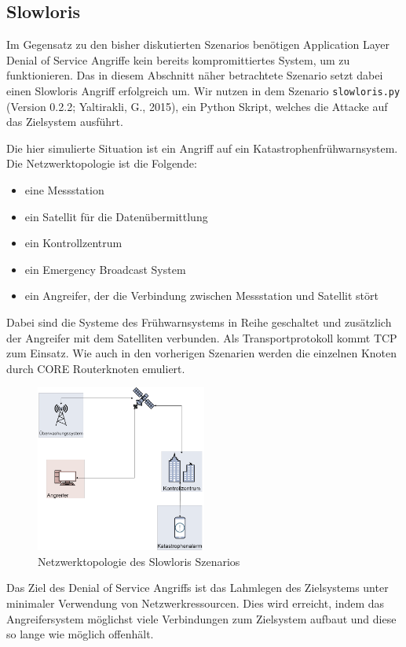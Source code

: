 \documentclass{article}
\begin{document}
\subsection{Slowloris}
Im Gegensatz zu den bisher diskutierten Szenarios benötigen Application Layer Denial of Service Angriffe kein bereits kompromittiertes System, um zu funktionieren. Das in diesem Abschnitt näher betrachtete Szenario setzt dabei einen Slowloris Angriff erfolgreich um. Wir nutzen in dem Szenario \texttt{slowloris.py} (Version 0.2.2; Yaltirakli, G., 2015)\cite{gkbrkslowloris}, ein Python Skript, welches die Attacke auf das Zielsystem ausführt.\par
Die hier simulierte Situation ist ein Angriff auf ein Katastrophenfrühwarnsystem. Die Netzwerktopologie ist die Folgende:
\begin{itemize}
\item eine Messstation
\item ein Satellit für die Datenübermittlung
\item ein Kontrollzentrum
\item ein Emergency Broadcast System
\item ein Angreifer, der die Verbindung zwischen Messstation und Satellit stört
\end{itemize}
Dabei sind die Systeme des Frühwarnsystems in Reihe geschaltet und zusätzlich der Angreifer mit dem Satelliten verbunden. Als Transportprotokoll kommt TCP zum Einsatz.
Wie auch in den vorherigen Szenarien werden die einzelnen Knoten durch CORE Routerknoten emuliert.\par
\begin{figure}[h]
\centering
\includegraphics[width=0.5\textwidth]{slowloris}
\caption{Netzwerktopologie des Slowloris Szenarios}
\end{figure}
Das Ziel des Denial of Service Angriffs ist das Lahmlegen des Zielsystems unter minimaler Verwendung von Netzwerkressourcen. Dies wird erreicht, indem das Angreifersystem möglichst viele Verbindungen zum Zielsystem aufbaut und diese so lange wie möglich offenhält.\par
\end{document}
